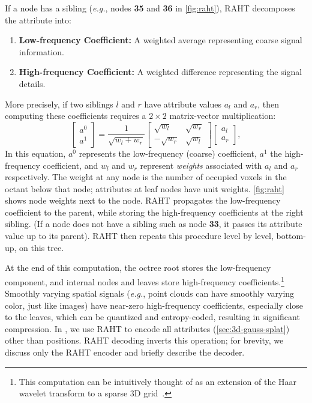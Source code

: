 If a node has a sibling (\textit{e.g.}, nodes \textbf{35} and \textbf{36} in \cref{fig:raht}), RAHT decomposes the attribute into:
\begin{enumerate}
    \item \textbf{Low-frequency Coefficient:} A weighted average representing coarse signal information. 
    \item \textbf{High-frequency Coefficient:} A weighted difference representing the signal details.
\end{enumerate}
%
More precisely, if two siblings $l$ and $r$ have attribute values $a_l$ and $a_r$, then computing these coefficients requires a $2 \times 2$ matrix-vector multiplication:
%
\begin{equation}
  \begin{bmatrix}
  a^0\\
  a^1
  \end{bmatrix}
  =
  \frac{1}{\sqrt{w_l+w_r}}
  \begin{bmatrix}
  \sqrt{w_l} & \sqrt{w_r}\\
  -\sqrt{w_r} & \sqrt{w_l}
  \end{bmatrix}
  \begin{bmatrix}
  a_l\\
  a_r
  \end{bmatrix},
  \label{eq:raht-butterfly}
\end{equation}
%
In this equation, $a^0$ represents the low-frequency (coarse) coefficient, $a^1$ the high-frequency coefficient, and $w_l$ and $w_r$ represent \textit{weights} associated with $a_l$ and $a_r$ respectively.
%
The weight at any node is the number of occupied voxels in the octant below that node; attributes at leaf nodes have unit weights.
%
\cref{fig:raht} shows node weights next to the node.
%
RAHT propagates the low-frequency coefficient to the parent, while storing the high-frequency coefficients at the right sibling.
%
(If a node does not have a sibling such as node \textbf{33}, it passes its attribute value up to its parent).
%
RAHT then repeats this procedure level by level, bottom-up, on this tree.

At the end of this computation, the octree root stores the low-frequency component, and internal nodes and leaves store high-frequency coefficients.\footnote{This computation can be intuitively thought of as an extension of the Haar wavelet transform to a sparse 3D grid~\cite{de2016compression}.}
%
Smoothly varying spatial signals (\textit{e.g.}, point clouds can have smoothly varying color, just like images) have near-zero high-frequency coefficients, especially close to the leaves, which can be quantized and entropy-coded, resulting in significant compression.
%
In \gsnfs{}, we use RAHT to encode all \gs{} attributes (\cref{sec:3d-gauss-splat}) other than positions.
%
RAHT decoding inverts this operation; for brevity, we discuss only the RAHT encoder and briefly describe the decoder.

